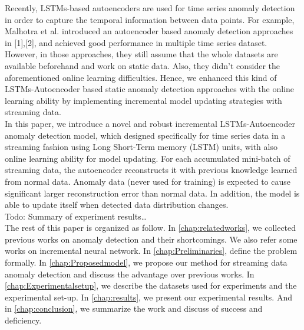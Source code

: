 Recently, LSTMs-based autoencoders are used for time series anomaly detection in order to capture the temporal information between data points. For example, Malhotra et al. introduced an autoencoder based anomaly detection approaches in [1],[2], and achieved good performance in multiple time series dataset. However, in those approaches, they still assume that the whole datasets are available beforehand and work on static data. Also, they didn’t consider the aforementioned online learning difficulties. Hence, we enhanced this kind of LSTMs-Autoencoder based static anomaly detection approaches with the online learning ability by implementing incremental model updating strategies with streaming data.\\

In this paper, we introduce a novel and robust incremental LSTMs-Autoencoder anomaly detection model, which designed specifically for time series data in a streaming fashion using Long Short-Term memory (LSTM) units, with also online learning ability for model updating. For each accumulated mini-batch of streaming data, the autoencoder reconstructs it with previous knowledge learned from normal data. Anomaly data (never used for training) is expected to cause significant larger reconstruction error than normal data. In addition, the model is able to update itself when detected data distribution changes.\\

Todo: Summary of experiment results…\\

The rest of this paper is organized as follow. In \autoref{chap:relatedworks}, we collected previous works on anomaly detection and their shortcomings. We also refer some works on incremental neural network. In \autoref{chap:Preliminaries}, define the problem formally. In \autoref{chap:Proposedmodel}, we propose our method for streaming data anomaly detection and discuss the advantage over previous works. In \autoref{chap:Experimentalsetup}, we describe the datasets used for experiments and the experimental set-up. In \autoref{chap:results}, we present our experimental results. And in \autoref{chap:conclusion}, we summarize the work and discuss of success and deficiency.
